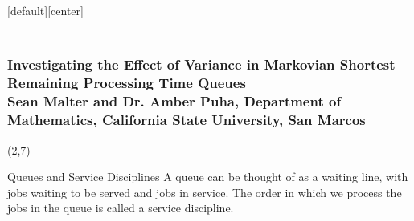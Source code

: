 \documentclass[16pt]{beamer}
\begin{document}
[default][center]
\begin{frame}
\frametitle{\\ {\Huge Investigating the Effect of Variance in Markovian Shortest Remaining Processing Time Queues}\\  Sean Malter and Dr. Amber Puha, Department of Mathematics, California State University, San Marcos}










\begin{textblock}{35}(2,7)
\begin{block}{\huge Queues and Service Disciplines}
A queue can be thought of as a waiting line, with jobs waiting to be served and jobs in service. The order in which we process the jobs in the queue is called a service discipline.
\vspace{\baselineskip}


\end{block}
\end{textblock}
\end{frame}
\end{document}
